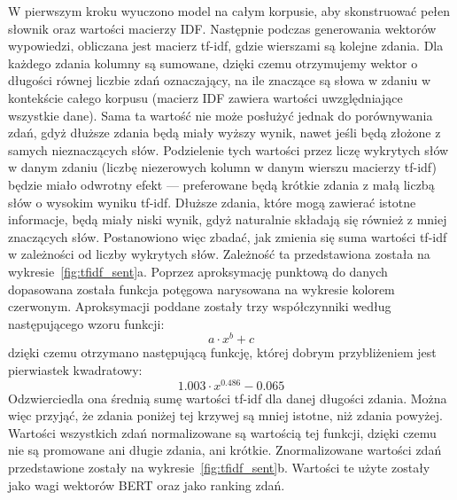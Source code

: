 		W pierwszym kroku wyuczono model na całym korpusie, aby skonstruować pełen słownik oraz wartości macierzy IDF\@.
		Następnie podczas generowania wektorów wypowiedzi, obliczana jest macierz tf-idf, gdzie wierszami są kolejne zdania.
		Dla każdego zdania kolumny są sumowane, dzięki czemu otrzymujemy wektor o długości równej liczbie zdań oznaczający,
			na ile znaczące są słowa w zdaniu w kontekście całego korpusu (macierz IDF zawiera wartości uwzględniające wszystkie dane).
		Sama ta wartość nie może posłużyć jednak do porównywania zdań, gdyż dłuższe zdania będą miały wyższy wynik, nawet jeśli będą złożone z samych nieznaczących słów.
		Podzielenie tych wartości przez liczę wykrytych słów w danym zdaniu (liczbę niezerowych kolumn w danym wierszu macierzy tf-idf) będzie miało odwrotny efekt
			--- preferowane będą krótkie zdania z małą liczbą słów o wysokim wyniku tf-idf.
		Dłuższe zdania, które mogą zawierać istotne informacje, będą miały niski wynik, gdyż naturalnie składają się również z mniej znaczących słów.
		Postanowiono więc zbadać, jak zmienia się suma wartości tf-idf w zależności od liczby wykrytych słów.
		Zależność ta przedstawiona została na wykresie~\ref{fig:tfidf_sent}a.
		Poprzez aproksymację punktową do danych dopasowana została funkcja potęgowa narysowana na wykresie kolorem czerwonym.
		Aproksymacji poddane zostały trzy współczynniki według następującego wzoru funkcji:
		\[a\cdot x^b + c\]
		dzięki czemu otrzymano następującą funkcję, której dobrym przybliżeniem jest pierwiastek kwadratowy:
		\[1.003\cdot x^{0.486} - 0.065\]
		Odzwierciedla ona średnią sumę wartości tf-idf dla danej długości zdania.
		Można więc przyjąć, że zdania poniżej tej krzywej są mniej istotne, niż zdania powyżej.
		Wartości wszystkich zdań normalizowane są wartością tej funkcji, dzięki czemu nie są promowane ani długie zdania, ani krótkie.
		Znormalizowane wartości zdań przedstawione zostały na wykresie~\ref{fig:tfidf_sent}b.
		Wartości te użyte zostały jako wagi wektorów BERT oraz jako ranking zdań.

